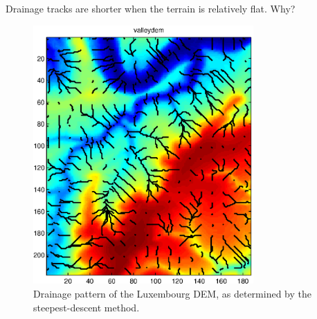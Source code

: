 
\begin{action}
Drainage tracks are shorter when the terrain is relatively flat. Why?
\end{action}



\begin{figure}[htbp]
  \centering
    \includegraphics[width=0.75\textwidth]{./../eps/drainpattern.eps}
  \caption{Drainage pattern of the Luxembourg DEM, as determined by the steepest-descent method.}
  \label{fig:drainpattern}
\end{figure}

